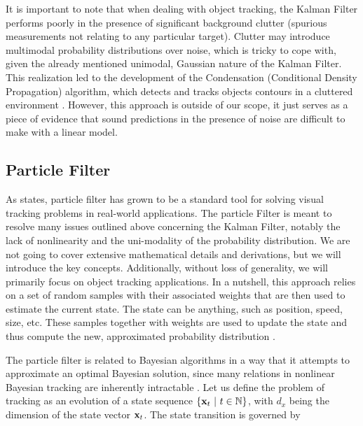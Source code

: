 It is important to note that when dealing with object tracking, the Kalman Filter performs poorly in the presence of significant background clutter (spurious measurements not relating to any particular target). Clutter may introduce multimodal probability distributions over noise, which is tricky to cope with, given the already mentioned unimodal, Gaussian nature of the Kalman Filter. This realization led to the development of the Condensation (Conditional Density Propagation) algorithm, which detects and tracks objects contours in a cluttered environment \cite{isard1998condensation}. However, this approach is outside of our scope, it just serves as a piece of evidence that sound predictions in the presence of noise are difficult to make with a linear model.

\subsection{Particle Filter}
\label{ssec:ParticleFilter}

As \cite{particle_filters_for_vot} states, particle filter has grown to be a standard tool for solving visual tracking problems in real-world applications. The particle Filter is meant to resolve many issues outlined above concerning the Kalman Filter, notably the lack of nonlinearity and the uni-modality of the probability distribution. We are not going to cover extensive mathematical details and derivations, but we will introduce the key concepts. Additionally, without loss of generality, we will primarily focus on object tracking applications. In a nutshell, this approach relies on a set of random samples with their associated weights that are then used to estimate the current state. The state can be anything, such as position, speed, size, etc. These samples together with weights are used to update the state and thus compute the new, approximated probability distribution \cite{welch1995introduction}.

The particle filter is related to Bayesian algorithms in a way that it attempts to approximate an optimal Bayesian solution, since many relations in nonlinear Bayesian tracking are inherently intractable \cite{Arulampalam2007}. Let us define the problem of tracking as an evolution of a state sequence $\left\{ {\mathbf{x}_t \ | \ t \in \mathbb{N}} \right\}$, with $d_x$ being the dimension of the state vector $\mathbf{x}_t$. The state transition is governed by

